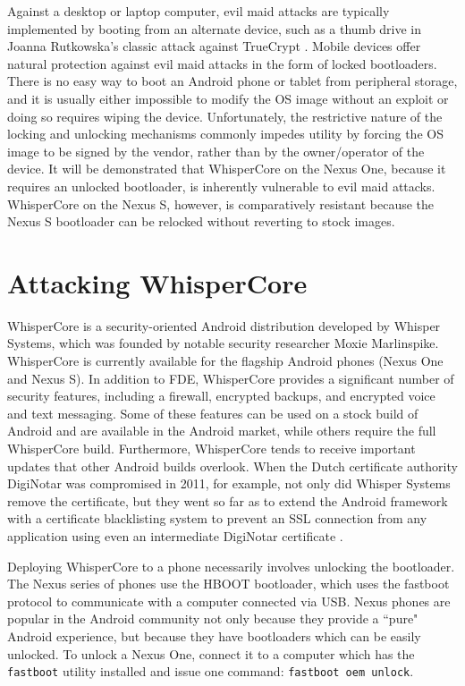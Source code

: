 Against a desktop or laptop computer, evil maid attacks are typically implemented by booting from an alternate device, such as a
thumb drive in Joanna Rutkowska's classic attack against TrueCrypt \cite{evilmaid}.  Mobile devices offer natural protection against evil
maid attacks in the form of locked bootloaders.  There is no easy way to boot an Android phone or tablet from peripheral storage,
and it is usually either impossible to modify the OS image without an exploit or doing so requires wiping the device.
Unfortunately, the restrictive nature of the locking and unlocking mechanisms commonly impedes utility by forcing the OS image to be
signed by the vendor, rather than by the owner/operator of the device. It will be demonstrated that WhisperCore on the Nexus One,
because it requires an unlocked bootloader, is inherently vulnerable to evil maid attacks.  WhisperCore on the Nexus S, however, is
comparatively resistant because the Nexus S bootloader can be relocked without reverting to stock images.  

\section{Attacking WhisperCore}
WhisperCore is a security-oriented Android distribution developed by Whisper Systems, which was founded by notable security
researcher Moxie Marlinspike.  WhisperCore is currently available for the flagship Android phones (Nexus One and Nexus S). In
addition to FDE, WhisperCore provides a significant number of security features, including a firewall, encrypted backups, and
encrypted voice and text messaging.  Some of these features can be used on a stock build of Android and are available in the Android
market, while others require the full WhisperCore build.  Furthermore, WhisperCore tends to receive important updates that other
Android builds overlook. When the Dutch certificate authority DigiNotar was compromised in 2011, for example, not only did Whisper
Systems remove the certificate, but they went so far as to extend the Android framework with a certificate blacklisting system to
prevent an SSL connection from any application using even an intermediate DigiNotar certificate \cite{whispernotar}. 

Deploying WhisperCore to a phone necessarily involves unlocking the bootloader.  The Nexus series of phones use the HBOOT
bootloader, which uses the fastboot protocol to communicate with a computer connected via USB.  Nexus phones are popular in the
Android community not only because they provide a ``pure" Android experience, but because they have bootloaders which can be easily
unlocked.  To unlock a Nexus One, connect it to a computer which has the \texttt{fastboot} utility installed and issue one command:
\texttt{fastboot oem unlock}.

